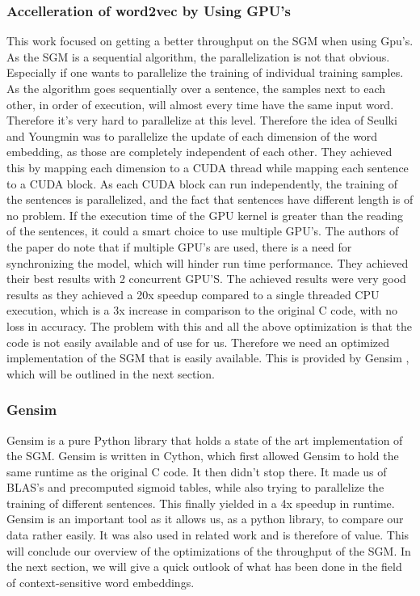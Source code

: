 \subsubsection{Accelleration of word2vec by Using GPU's}
This work \cite{gpu} focused on getting a better throughput on the SGM when using Gpu's. As the SGM is a sequential algorithm, the parallelization is not that obvious. Especially if one wants to parallelize the training of individual training samples. As the algorithm goes sequentially over a sentence,  the samples next to each other, in order of execution, will almost every time have the same input word. Therefore it's very hard to parallelize at this level.  Therefore the idea of Seulki and Youngmin \cite{gpu} was to parallelize the update of each dimension of the word embedding, as those are completely independent of each other. They achieved this by mapping each dimension to a CUDA thread while mapping each sentence to a CUDA block. As each CUDA block can run independently, the training of the sentences is parallelized, and the fact that sentences have different length is of no problem. If the execution time of the GPU kernel is greater than the reading of the sentences, it could a smart choice to use multiple GPU's. The authors of the paper do note that if multiple GPU's are used, there is a need for synchronizing the model, which will hinder run time performance. They achieved their best results with 2 concurrent GPU'S. The achieved results were very good results as they achieved a 20x speedup compared to a single threaded CPU execution, which is a 3x increase in comparison to the original C code, with no loss in accuracy.  The problem with this and all the above optimization is that the code is not easily available and of use for us. Therefore we need an optimized implementation of the SGM that is easily available. This is provided by Gensim \cite{gensim}, which will be outlined in the next section.
\subsubsection{Gensim}
Gensim \cite{gensim} is a pure Python library that holds a state of the art implementation of the SGM. Gensim is written in Cython, which first allowed Gensim to hold the same runtime as the original C code. It then didn't stop there. It made us of BLAS's and precomputed sigmoid tables, while also trying to parallelize the training of different sentences. This finally yielded in a 4x speedup in runtime.  Gensim is an important tool as it allows us, as a python library, to compare our data rather easily. It was also used in related work \cite{intel} and is therefore of value. This will conclude our overview of the optimizations of the throughput of the SGM. In the next section, we will give a quick outlook of what has been done in the field of context-sensitive word embeddings.



